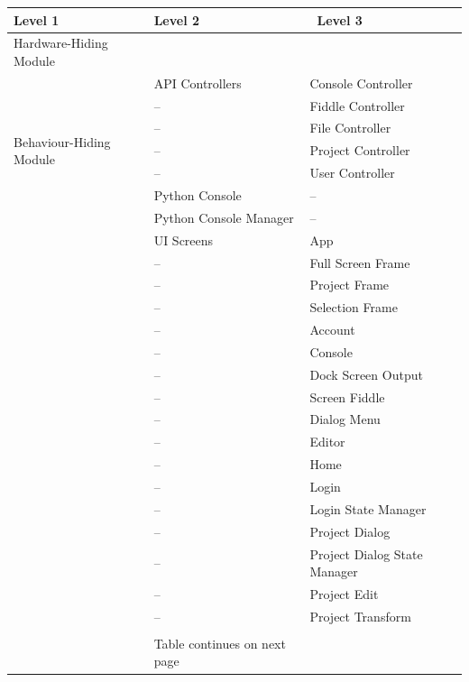 \documentclass[12pt, titlepage]{article}
\begin{document}
\begin{table}[h!]
\centering
\begin{tabular}{p{} p{} p{}}
\toprule
    \textbf{Level 1} & \textbf{Level 2} &\ \textbf{Level 3}\\
\midrule

{Hardware-Hiding Module} & ~ \\
\midrule

\multirow{7}{0.3\textwidth}{
    Behaviour-Hiding Module} & API Controllers & Console Controller\\
    & -- & Fiddle Controller\\
    & -- & File Controller\\
    & -- & Project Controller\\
    & -- & User Controller\\

    & Python Console & --\\
    & Python Console Manager & --\\

    & UI Screens & App\\
    & -- & Full Screen Frame\\
    & -- & Project Frame\\
    & -- & Selection Frame\\
    & -- & Account\\
    & -- & Console\\
    & -- & Dock Screen Output\\
    & -- & Screen Fiddle\\
    & -- & Dialog Menu\\
    & -- & Editor\\
    & -- & Home\\
    & -- & Login\\
    & -- & Login State Manager\\
    & -- & Project Dialog\\
    & -- & Project Dialog State Manager\\
    & -- & Project Edit\\
    & -- & Project Transform\\
    & & \\
\bottomrule
    & Table continues on next page & \\
\end{tabular}
\end{table}
\end{document}
